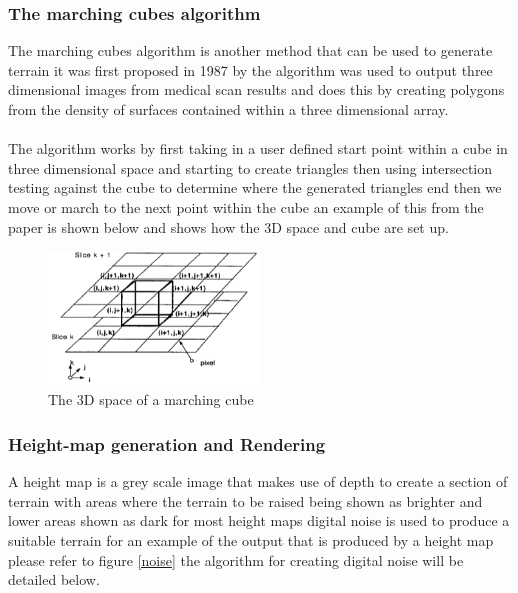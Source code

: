 \subsubsection{The marching cubes algorithm}
The marching cubes algorithm is another method that can be used to generate terrain it was first proposed in 1987 by \cite{marching} the algorithm was used to output three dimensional images from medical scan results and does this by creating polygons from the density of surfaces contained within a three dimensional array.\\\\The algorithm works by first taking in a user defined start point within a cube in three dimensional space and starting to create triangles then using intersection testing against the cube to determine where the generated triangles end then we move or march to the next point within the cube an example of this from the paper \cite{marching} is shown below and shows how the 3D space and cube are set up.     

\begin{figure}[ht!]
	\includegraphics[width=0.5\textwidth]{images/Marchingcubes}
	\caption{The 3D space of a marching cube}	 \label{cube}
\end{figure}

\subsubsection{Height-map generation and Rendering}
A height map is a grey scale image that makes use of depth to create a section of terrain with areas where the terrain to be raised being shown as brighter and lower areas shown as dark for most height maps digital noise is used to produce a suitable terrain for an example of the output that is produced by a height map please refer to figure \ref{noise} the algorithm for creating digital noise will be detailed below. 

